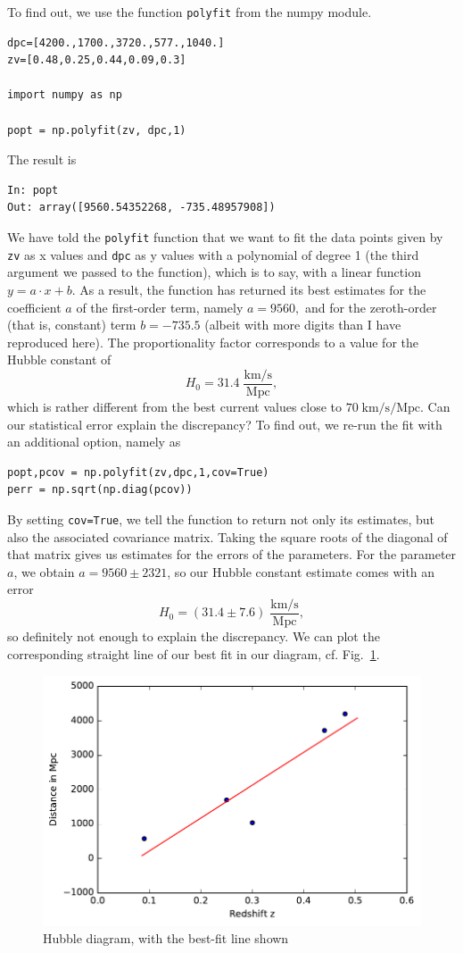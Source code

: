 \documentclass[twocolumn,apj]{openjournal}
\newcommand{\be}{\begin{equation}}
\newcommand{\ee}{\end{equation}}
\begin{document}
To find out, we use the function \verb|polyfit| from the numpy module. 
\begin{lstlisting}
dpc=[4200.,1700.,3720.,577.,1040.]
zv=[0.48,0.25,0.44,0.09,0.3]

import numpy as np

popt = np.polyfit(zv, dpc,1)
\end{lstlisting}
The result is
\begin{lstlisting}
In: popt
Out: array([9560.54352268, -735.48957908])
\end{lstlisting}
We have told the \verb|polyfit| function that we want to fit the data points given by \verb|zv| as x values and \verb|dpc| as y values with a polynomial of degree 1 (the third argument we passed to the function), which is to say, with a linear function $y=a\cdot x+b$. As a result, the function has returned its best estimates for the coefficient $a$ of the first-order term, namely $a=9560,$ and for the zeroth-order (that is, constant) term $b=-735.5$ (albeit with more digits than I have reproduced here). The proportionality factor corresponds to a value for the Hubble constant of
\be
H_0 = 31.4\;\frac{\mbox{km/s}}{\mbox{Mpc}},
\ee
which is rather different from the best current values close to $70\;\mbox{km/s/Mpc}$. Can our statistical error explain the discrepancy? To find out, we re-run the fit with an additional option, namely as
\begin{lstlisting}
popt,pcov = np.polyfit(zv,dpc,1,cov=True)
perr = np.sqrt(np.diag(pcov))
\end{lstlisting}
By setting \verb|cov=True|, we tell the function to return not only its estimates, but also the associated covariance matrix. Taking the square roots of the diagonal of that matrix gives us estimates for the errors of the parameters. For the parameter $a$, we obtain $a = 9560\pm 2321$, so our Hubble constant estimate comes with an error
\be
H_0 = (31.4\pm 7.6)\;\frac{\mbox{km/s}}{\mbox{Mpc}},
\ee
so definitely not enough to explain the discrepancy. We can plot the corresponding straight line of our best fit in our diagram, cf. Fig.~\ref{HubbleFitted}.
\begin{figure}[htbp]
\begin{center}
\includegraphics[width=\linewidth]{hubble-line.pdf}
\caption{Hubble diagram, with the best-fit line shown}
\label{HubbleFitted}
\end{center}
\end{figure}
\end{document}

